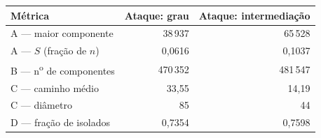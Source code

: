 \begin{tabular}{lrr}
\hline
\textbf{Métrica} & \textbf{Ataque: grau} & \textbf{Ataque: intermediação} \\ \hline
A --- maior componente & 38\,937 & 65\,528 \\
A --- $S$ (fração de $n$) & 0,0616 & 0,1037 \\
B --- n\textsuperscript{o} de componentes & 470\,352 & 481\,547 \\
C --- caminho médio & 33,55 & 14,19 \\
C --- diâmetro & 85 & 44 \\
D --- fração de isolados & 0,7354 & 0,7598 \\
\hline
\end{tabular}
